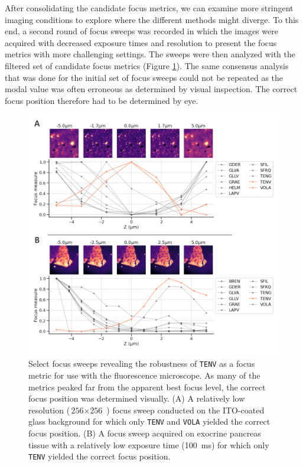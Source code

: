 After consolidating the candidate focus metrics, we can examine more stringent imaging conditions to explore where the different methods might diverge. To this end, a second round of focus sweeps was recorded in which the images were acquired with decreased exposure times and resolution to present the focus metrics with more challenging settings. The sweeps were then analyzed with the filtered set of candidate focus metrics (Figure \ref{fig:A.4_moresweeps}). The same consensus analysis that was done for the initial set of focus sweeps could not be repeated as the modal value was often erroneous as determined by visual inspection. The correct focus position therefore had to be determined by eye.

\begin{figure}[!tb]
    \centering
    \includegraphics[width=\linewidth]{cppendix-A/figures/figA-4_moresweeps.pdf}
    \caption{Select focus sweeps revealing the robustness of \texttt{TENV} as a focus metric for use with the fluorescence microscope.
    As many of the metrics peaked far from the apparent best focus level, the correct focus position was determined visually.
    (A) A relatively low resolution ($\text{256} \times \text{256}$ \si{\pixel}) focus sweep conducted on the ITO-coated glass background for which only \texttt{TENV} and \texttt{VOLA} yielded the correct focus position.
    (B) A focus sweep acquired on exocrine pancreas tissue with a relatively low exposure time (\SI{100}{\milli\second}) for which only \texttt{TENV} yielded the correct focus position.}
    \label{fig:A.4_moresweeps}
\end{figure}

